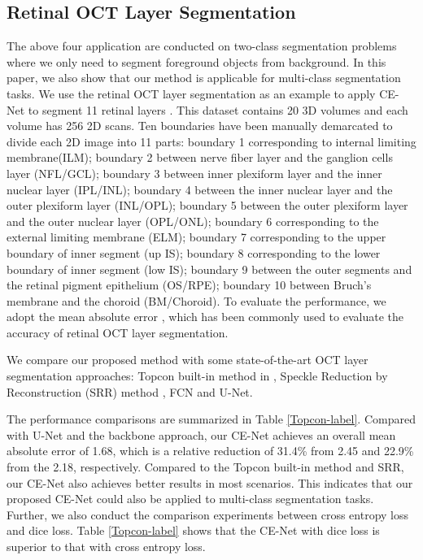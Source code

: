 \documentclass[journal]{IEEEtran}
\begin{document}
\subsection{Retinal OCT Layer Segmentation}
The above four application are conducted on two-class segmentation problems where we only need to segment foreground objects from background. In this paper, we also show that our method is applicable for multi-class segmentation tasks. We use the retinal OCT layer segmentation as an example to apply CE-Net to segment 11 retinal layers \cite{cheng2016speckle}. This dataset contains 20 3D volumes and each volume has 256 2D scans. Ten boundaries have been manually demarcated to divide each 2D image into 11 parts: boundary 1 corresponding to internal limiting membrane(ILM); boundary 2 between nerve fiber layer and the ganglion cells layer (NFL/GCL); boundary 3 between inner plexiform layer and the inner nuclear layer (IPL/INL); boundary 4 between the inner nuclear layer and the outer plexiform layer (INL/OPL); boundary 5 between the outer plexiform layer and the outer nuclear layer (OPL/ONL); boundary 6 corresponding to the external limiting membrane (ELM); boundary 7 corresponding to the upper boundary of inner segment (up IS); boundary 8 corresponding to the lower boundary of inner segment (low IS); boundary 9 between the outer segments and the retinal pigment epithelium (OS/RPE); boundary 10 between Bruch’s membrane and the choroid (BM/Choroid). 
To evaluate the performance, we adopt the mean absolute error \cite{cheng2016speckle}, which has been commonly used to evaluate the accuracy of retinal OCT layer segmentation. 


We compare our proposed method with some state-of-the-art OCT layer segmentation approaches: Topcon built-in method in \cite{cheng2016speckle}, Speckle Reduction by Reconstruction (SRR) method \cite{cheng2016speckle}, FCN\cite{long2015fully} and U-Net\cite{ronneberger2015u}. 

The performance comparisons are summarized in Table \ref{Topcon-label}. Compared with U-Net and the backbone approach, our CE-Net achieves an overall mean absolute error of 1.68, which is a relative reduction of 31.4\% from 2.45 and 22.9\% from the 2.18, respectively. Compared to the Topcon built-in method and SRR, our CE-Net also achieves better results in most scenarios. This indicates that our proposed CE-Net could also be applied to multi-class segmentation tasks. Further, we also conduct the comparison experiments between cross entropy loss and dice loss. Table \ref{Topcon-label} shows that the CE-Net with dice loss is superior to that with cross entropy loss. 
\end{document}
